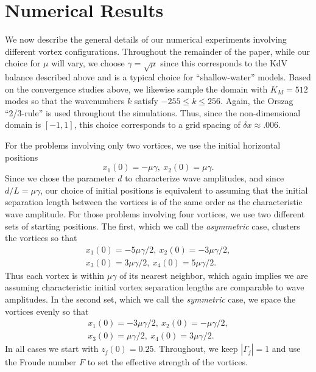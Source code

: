 \documentclass[a4paper,11pt]{article}
\begin{document}
\section{Numerical Results}

We now describe the general details of our numerical experiments involving different vortex configurations.  Throughout the remainder of the paper, while our choice for $\mu$ will vary, we choose $\gamma = \sqrt{\mu}$ since this corresponds to the KdV balance described above and is a typical choice for ``shallow-water'' models.  Based on the convergence studies above, we likewise sample the domain with $K_{M} = 512$ modes so that the wavenumbers $k$ satisfy $-255\leq k \leq 256$.  Again, the Orszag ``2/3-rule'' is used throughout the simulations.  Thus, since the non-dimensional domain is $[-1,1]$, this choice corresponds to a grid spacing of $\delta x \approx .006$.  

For the problems involving only two vortices, we use the initial horizontal positions
\begin{equation}
x_{1}(0)=-\mu\gamma, \ x_{2}(0)=\mu\gamma.
\label{initxpostv}
\end{equation}
Since we chose the parameter $d$ to characterize wave amplitudes, and since $d/L=\mu\gamma$, our choice of initial positions is equivalent to assuming that the initial  separation length between the vortices is of the same order as the characteristic wave amplitude.  For those problems involving four vortices, we use two different sets of starting positions.  The first, which we call the {\it asymmetric} case, clusters the vortices so that  
\begin{align*}
x_{1}(0)=-5\mu\gamma/2, ~ x_{2}(0)=-3\mu\gamma/2,\\ 
x_{3}(0)=3\mu\gamma/2,  ~ x_{4}(0)=5\mu\gamma/2.
\end{align*}
Thus each vortex is within $\mu\gamma$ of its nearest neighbor, which again implies we are assuming characteristic initial vortex separation lengths are comparable to wave amplitudes.  In the second set, which we call the {\it symmetric} case, we space the vortices evenly so that 
\begin{align*}
x_{1}(0)=-3\mu\gamma/2,  ~ x_{2}(0)=-\mu\gamma/2,\\ 
x_{3}(0)=\mu\gamma/2,   ~ x_{4}(0)=3\mu\gamma/2.
\end{align*}
In all cases we start with $z_{j}(0)=0.25$.  Throughout, we keep $|\Gamma_{j}|=1$ and use the Froude number $F$ to set the effective strength of the vortices.  
\end{document}

